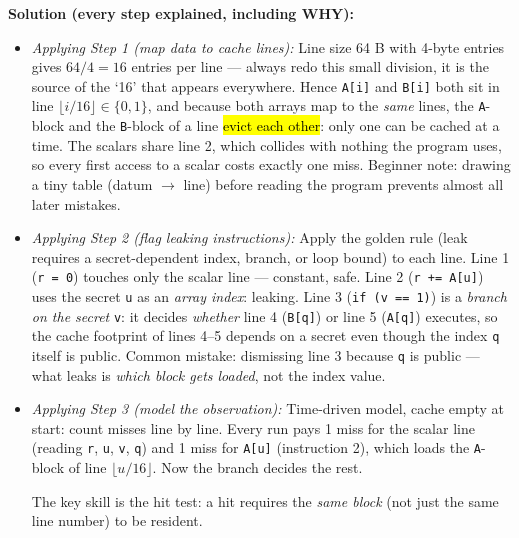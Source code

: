 \documentclass[12pt, a4paper]{article}
\newcommand{\imp}[1]{\hl{#1}}                       %
\begin{document}
\textbf{Solution (every step explained, including WHY):}
\begin{itemize}
    \item \textit{Applying Step 1 (map data to cache lines):} Line size 64 B with 4-byte entries gives $64/4 = 16$ entries per line --- always redo this small division, it is the source of the `16' that appears everywhere. Hence \texttt{A[i]} and \texttt{B[i]} both sit in line $\lfloor i/16 \rfloor \in \{0,1\}$, and because both arrays map to the \emph{same} lines, the \texttt{A}-block and the \texttt{B}-block of a line \imp{evict each other}: only one can be cached at a time. The scalars share line 2, which collides with nothing the program uses, so every first access to a scalar costs exactly one miss. Beginner note: drawing a tiny table (datum $\rightarrow$ line) before reading the program prevents almost all later mistakes.
    \item \textit{Applying Step 2 (flag leaking instructions):} Apply the golden rule (leak requires a secret-dependent index, branch, or loop bound) to each line. Line 1 (\texttt{r = 0}) touches only the scalar line --- constant, safe. Line 2 (\texttt{r += A[u]}) uses the secret \texttt{u} as an \emph{array index}: leaking. Line 3 (\texttt{if (v == 1)}) is a \emph{branch on the secret} \texttt{v}: it decides \emph{whether} line 4 (\texttt{B[q]}) or line 5 (\texttt{A[q]}) executes, so the cache footprint of lines 4--5 depends on a secret even though the index \texttt{q} itself is public. Common mistake: dismissing line 3 because \texttt{q} is public --- what leaks is \emph{which block gets loaded}, not the index value.
    \item \textit{Applying Step 3 (model the observation):} Time-driven model, cache empty at start: count misses line by line. Every run pays 1 miss for the scalar line (reading \texttt{r}, \texttt{u}, \texttt{v}, \texttt{q}) and 1 miss for \texttt{A[u]} (instruction 2), which loads the \texttt{A}-block of line $\lfloor u/16 \rfloor$. Now the branch decides the rest.  The key skill is the hit test: a hit requires the \emph{same block} (not just the same line number) to be resident.

\end{itemize}
\end{document}
